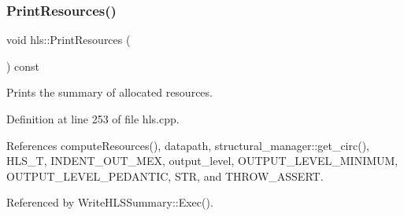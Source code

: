 \subsubsection{\texorpdfstring{Print\+Resources()}{PrintResources()}}
{\footnotesize\ttfamily void hls\+::\+Print\+Resources (\begin{DoxyParamCaption}{ }\end{DoxyParamCaption}) const}



Prints the summary of allocated resources. 



Definition at line 253 of file hls.\+cpp.



References compute\+Resources(), datapath, structural\+\_\+manager\+::get\+\_\+circ(), H\+L\+S\+\_\+T, I\+N\+D\+E\+N\+T\+\_\+\+O\+U\+T\+\_\+\+M\+EX, output\+\_\+level, O\+U\+T\+P\+U\+T\+\_\+\+L\+E\+V\+E\+L\+\_\+\+M\+I\+N\+I\+M\+UM, O\+U\+T\+P\+U\+T\+\_\+\+L\+E\+V\+E\+L\+\_\+\+P\+E\+D\+A\+N\+T\+IC, S\+TR, and T\+H\+R\+O\+W\+\_\+\+A\+S\+S\+E\+RT.



Referenced by Write\+H\+L\+S\+Summary\+::\+Exec().

